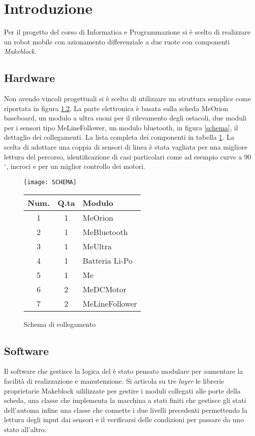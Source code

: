 \section{Introduzione}
\label{introduzine}
Per il progetto del corso di Informatica e Programmazione si è scelto di realizzare un robot mobile con azionamento differenziale a due ruote con componenti \emph{Makeblock}.

\subsection{Hardware}
Non avendo vincoli progettuali si è scelto di utilizzare un struttura semplice come riportata in figura \ref{}. %
La parte elettronica è basata sulla scheda MeOrion baseboard, un modulo a ultra suoni per il rilevamento degli ostacoli, due moduli per i sensori tipo MeLineFollower, un modulo bluetooth, in figura \ref{schema}, il dettaglio dei collegamenti. La lista completa dei componenti in tabella \ref{bom}.
La scelta di adottare una coppia di sensori di linea è stata vagliata per una migliore lettura del percorso, identificazione di casi particolari come ad esempio curve a 90$^{\circ}$, incroci e per un miglior controllo dei motori.

\begin{figure}[htp]
\centering
\hfill
\begin{minipage}[b]{.65\columnwidth}
 \texttt{[image: SCHEMA]}
	\caption{Schema di collegamento}
	\label{schema}
\end{minipage}
\begin{minipage}[b]{.3\columnwidth}
  \begin{tabular}{ccl}
	Num. & Q.ta & Modulo\\
	\hline
	1		&		1	&	MeOrion\\
	2		&		1	&	MeBluetooth \\
	3		&		1	&	MeUltra \\
	4		&		1	&	Batteria Li-Po\\
	5		&		1	&	Me\\
	6		&		2	&	MeDCMotor\\
	7		&		2	&	MeLineFollower	\\
	\hline
  \end{tabular}
  \label{bom}
\end{minipage}\hspace*{\fill}
\end{figure}

\subsection{Software}
Il software che gestisce la logica del è stato pensato modulare per aumentare la facilità di realizzazione e manutenzione.
Si articola su tre \emph{layer} le librerie proprietarie Makeblock uililizzate per gestire i moduli collegati alle porte della scheda, una classe che implementa la macchina a stati finiti che gestisce gli stati dell'automa infine una classe che connette i due livelli precedenti permettendo la lettura degli input dai sensori e il verificarsi delle condizioni per passare da uno stato all'altro.